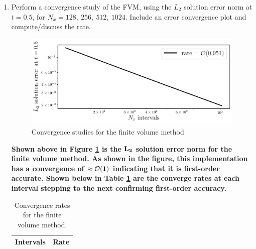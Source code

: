 \pagebreak
\begin{enumerate}[label=\alph*., start = 3]
    \item Perform a convergence study of the FVM, using the $L_2$ solution error norm at $t = 0.5$, for $N_x= 128,\ 256,\ 512,\ 1024.$  Include an error convergence plot and compute/discuss the rate.
    
    \begin{figure}[h]
        \centering
        \includegraphics[width = 0.9\linewidth]{q1/convergence.pdf}
        \caption{Convergence studies for the finite volume method}
        \label{fig:q1_converge}
    \end{figure}

    \begin{fminipage}{0.8\linewidth}
        \textbf{Shown above in Figure \ref{fig:q1_converge} is the $\bf L_2$ solution error norm for the finite volume method. As shown in the figure, this implementation has a convergence of $\bf \approx \mathcal{O}(1)$ indicating that it is first-order accurate. Shown below in Table \ref{tab:q1_convergences} are the converge rates at each interval stepping to the next confirming first-order accuracy.}
    \end{fminipage}


    \begin{table}[h]
        \centering
        \caption{Convergence rates for the finite volume method.}
        \label{tab:q1_convergences}
        \begin{tabular}{l | l}
            Intervals & Rate\\\hline\hline
            
        \end{tabular}
    \end{table}
\end{enumerate}
